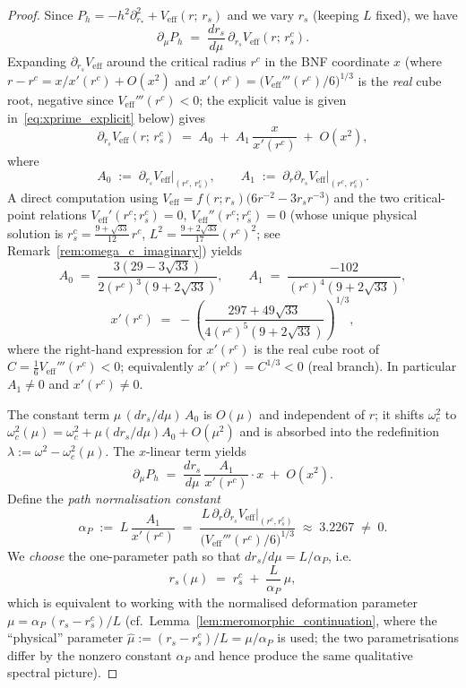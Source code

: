 \documentclass[12pt,a4paper]{amsart}
\theoremstyle{remark}
\begin{document}
\begin{proof}
Since $P_{h} = -h^{2}\partial_{r_{*}}^{2} + V_{\mathrm{eff}}(r;\,r_{s})$ and we
vary $r_{s}$ (keeping $L$ fixed), we have
\[
  \partial_{\mu}P_{h} \;=\; \frac{dr_{s}}{d\mu}\,\partial_{r_{s}}V_{\mathrm{eff}}(r;\,r_{s}^{c}).
\]
Expanding $\partial_{r_{s}}V_{\mathrm{eff}}$ around the critical radius $r^{c}$ in
the BNF coordinate $x$ (where $r - r^{c} = x/x'(r^{c}) + O(x^{2})$ and
$x'(r^{c}) = \bigl(V_{\mathrm{eff}}'''(r^{c})/6\bigr)^{1/3}$ is the \emph{real} cube root,
negative since $V_{\mathrm{eff}}'''(r^{c}) < 0$; the explicit value is given
in~\eqref{eq:xprime_explicit} below) gives
\[
  \partial_{r_{s}}V_{\mathrm{eff}}(r;\,r_{s}^{c})
  \;=\;
  A_{0} \;+\; A_{1}\,\frac{x}{x'(r^{c})} \;+\; O(x^{2}),
\]
where
\[
  A_{0} \;:=\; \partial_{r_{s}}V_{\mathrm{eff}}\!\big|_{(r^{c},\,r_{s}^{c})},
  \qquad
  A_{1} \;:=\; \partial_{r}\partial_{r_{s}}V_{\mathrm{eff}}\!\big|_{(r^{c},\,r_{s}^{c})}.
\]
A direct computation using $V_{\mathrm{eff}} = f(r;r_{s})\bigl(6r^{-2}-3r_{s}r^{-3}\bigr)$
and the two critical-point relations
$V_{\mathrm{eff}}'(r^{c};r_{s}^{c})=0$, $V_{\mathrm{eff}}''(r^{c};r_{s}^{c})=0$
(whose unique physical solution is $r_{s}^{c} = \tfrac{9+\sqrt{33}}{12}\,r^{c}$,
$L^{2} = \tfrac{9+2\sqrt{33}}{17}(r^{c})^{2}$; see Remark~\ref{rem:omega_c_imaginary})
yields
\begin{equation}\label{eq:xprime_explicit}
  A_{0} \;=\; \frac{3(29-3\sqrt{33})}{2(r^{c})^{3}(9+2\sqrt{33})}, \qquad
  A_{1} \;=\; \frac{-102}{(r^{c})^{4}(9+2\sqrt{33})},
\end{equation}
\begin{equation*}
  x'(r^{c}) \;=\; -\left(\frac{297+49\sqrt{33}}{4(r^{c})^{5}(9+2\sqrt{33})}\right)^{1/3},
\end{equation*}
where the right-hand expression for $x'(r^{c})$ is the real cube root of
$C = \tfrac{1}{6}V_{\mathrm{eff}}'''(r^{c}) < 0$; equivalently $x'(r^{c}) = C^{1/3} < 0$
(real branch).
In particular $A_{1} \neq 0$ and $x'(r^{c}) \neq 0$.

The constant term $\mu\,(dr_{s}/d\mu)\,A_{0}$ is $O(\mu)$ and independent of $r$;
it shifts $\omega_{c}^{2}$ to $\omega_{c}^{2}(\mu) = \omega_{c}^{2} + \mu(dr_{s}/d\mu)A_{0} + O(\mu^{2})$
and is absorbed into the redefinition $\lambda := \omega^{2} - \omega_{c}^{2}(\mu)$.
The $x$-linear term yields
\[
  \partial_{\mu}P_{h}
  \;=\;
  \frac{dr_{s}}{d\mu}\,\frac{A_{1}}{x'(r^{c})}\cdot x \;+\; O(x^{2}).
\]
Define the \emph{path normalisation constant}
\[
  \alpha_{P}
  \;:=\;
  L\,\frac{A_{1}}{x'(r^{c})}
  \;=\;
  \frac{L\,\partial_{r}\partial_{r_{s}}V_{\mathrm{eff}}\big|_{(r^{c},r_{s}^{c})}}
       {\bigl(V_{\mathrm{eff}}'''(r^{c})/6\bigr)^{1/3}}
  \;\approx\; 3.2267 \;\neq\; 0.
\]
We \emph{choose} the one-parameter path so that $dr_{s}/d\mu = L/\alpha_{P}$, i.e.\
\[
  r_{s}(\mu) \;=\; r_{s}^{c} \;+\; \frac{L}{\alpha_{P}}\,\mu,
\]
which is equivalent to working with the normalised deformation parameter
$\mu = \alpha_{P}\,(r_{s}-r_{s}^{c})/L$ (cf.\ Lemma~\ref{lem:meromorphic_continuation},
where the ``physical'' parameter $\hat\mu := (r_{s}-r_{s}^{c})/L = \mu/\alpha_{P}$
is used; the two parametrisations differ by the nonzero constant $\alpha_{P}$
and hence produce the same qualitative spectral picture).


\end{proof}
\end{document}
